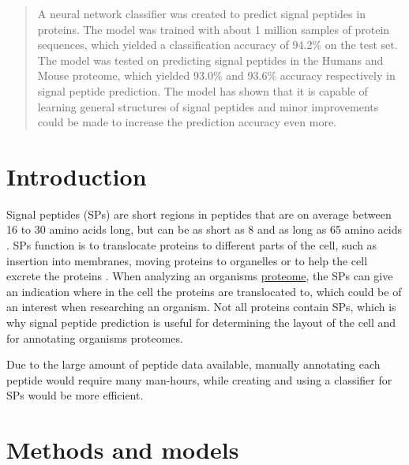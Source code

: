 \begin{abstract}
A neural network classifier was created to predict signal peptides in proteins. The model was trained with about 1 million samples of protein sequences, which yielded a classification accuracy of 94.2\% on the test set.
The model was tested on predicting signal peptides in the Humans and Mouse proteome, which yielded 93.0\% and 93.6\% accuracy respectively in signal peptide prediction.
The model has shown that it is capable of learning general structures of signal peptides and minor improvements could be made to increase the prediction accuracy even more.

\end{abstract}


\section{Introduction}


Signal peptides (SPs) are short regions in peptides that are on average between 16 to 30 amino acids long, but can be as short as 8 and as long as 65 amino acids \cite{sp_length}. SPs function is to translocate proteins to different parts of the cell, such as insertion into membranes, moving proteins to organelles or to help the cell excrete the proteins \cite{sp_wiki}. When analyzing an organisms  \href{https://en.wikipedia.org/wiki/Proteome}{proteome}, the SPs can give an indication where in the cell the proteins are translocated to, which could be of an interest when researching an organism. Not all proteins contain SPs, which is why signal peptide prediction is useful for determining the layout of the cell and for annotating organisms proteomes. 

Due to the large amount of peptide data available, manually annotating each peptide would require many man-hours, while creating and using a classifier for SPs would be more efficient.



\section{Methods and models}

